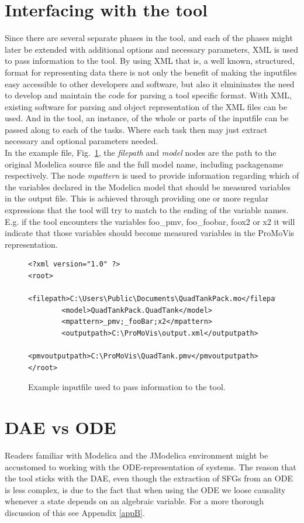 \section{Interfacing with the tool}
Since there are several separate phases in the tool, and each of the phases might later be extended with additional options and necessary parameters, XML is used to pass information to the tool. By using XML that is, a well known, structured, format for representing data there is not only the benefit of making the inputfiles easy accessible to other developers and software, but also it elmininates the need to develop and maintain the code for parsing a tool specific format. With XML, existing software for parsing and object representation of the XML files can be used. And in the tool, an instance, of the whole or parts of the inputfile can be passed along to each of the tasks. Where each task then may just extract necessary and optional parameters needed. \\\newline %
In the example file,  Fig.~\ref{fig:coding},  %
the \textit{filepath} and \textit{model} nodes are the path to the original Modelica source file and the full model name, including packagename respectively. The node \textit{mpattern} is used to provide information regarding which of the variables declared in the Modelica model that should be measured variables in the output file. This is achieved through providing one or more regular expressions that the tool will try to match to the ending of the variable names. E.g. if the tool encounters the variables foo\_pmv, foo\_foobar, foox2 or x2 it will indicate that those variables should become measured variables in the ProMoVis representation.
%
\begin{figure}
\lstset{language=XML}
\begin{lstlisting}
<?xml version="1.0" ?> 
<root>
        <filepath>C:\Users\Public\Documents\QuadTankPack.mo</filepath>
        <model>QuadTankPack.QuadTank</model>
        <mpattern>_pmv;_fooBar;x2</mpattern>
        <outputpath>C:\ProMoVis\output.xml</outputpath>
        <pmvoutputpath>C:\ProMoVis\QuadTank.pmv</pmvoutputpath>
</root>
\end{lstlisting}
\caption{Example inputfile used to pass information to the tool.}
\label{fig:coding}
\end{figure} 
%



\section{DAE vs ODE}
Readers familiar with Modelica and the JModelica environment might be accustomed to working with the ODE-representation of systems. The reason that the tool sticks with the DAE, even though the extraction of SFGs from an ODE is less complex, is due to the fact that when using the ODE we loose causality whenever a state depends on an algebraic variable. For a more thorough discussion of this see Appendix \ref{appB}.


